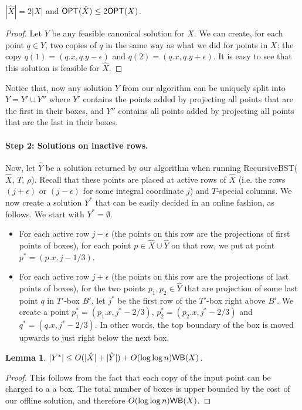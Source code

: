 \documentclass[11pt]{article}
\numberwithin{equation}{section}
\newtheorem{lemma}[theorem]{Lemma}
\theoremstyle{definition}
\theoremstyle{plain}
\begin{document}
\begin{observation}
$|\hat{X}| = 2|X|$ and $\mbox{\sf OPT}(\hat{X}) \leq 2 \mbox{\sf OPT}(X)$. 
\end{observation} 
\begin{proof}
Let $Y$ be any feasible canonical solution for $X$. 
We can create, for each point $q \in Y$, two copies of $q$ in the same way as what we did for points in $X$: the copy $q(1) = (q.x, q.y- \epsilon)$ and $q(2) = (q.x, q.y+\epsilon)$. 
It is easy to see that this solution is feasible for $\hat{X}$.  
\end{proof} 
 
%
Notice that, now any solution $Y$ from our algorithm can be uniquely split into $Y = Y' \cup Y''$ where $Y'$ contains the points added by projecting all points that are the first in their boxes, and $Y''$ contains all points added by projecting all points that are the last in their boxes.
 

\paragraph*{Step 2: Solutions on inactive rows.} 
Now, let $\hat{Y}$ be a solution returned by our algorithm when running {\sc RecursiveBST}($\hat{X}$, $T$, $\rho$). 
Recall that these points are placed at active rows of $\hat{X}$ (i.e. the rows $(j+\epsilon)$ or $(j-\epsilon)$ for some integral coordinate $j$) and $T$-special columns. 
We now create a solution $Y^*$ that can be easily decided in an online fashion, as follows. We start with $Y^* = \emptyset$. 

\begin{itemize}
\item For each active row $j - \epsilon$ (the points on this row are the projections of first points of boxes), for each point $p \in \hat{X} \cup \hat{Y}$ on that row, we put at point $p^* = (p.x, j-1/3)$.  


\item For each active row $j+\epsilon$ (the points on this row are the projections of last points of boxes), for the two points $p_1, p_2 \in \hat{Y}$ that are projection of some last point $q$ in $T'$-box $B'$, let $j^*$ be the first row of the $T'$-box right above $B'$. We create a point $p^*_1 = (p_1.x, j^* - 2/3)$, $p^*_2 = (p_2.x, j^* - 2/3)$ and $q^* = (q.x, j^* - 2/3)$.
In other words, the top boundary of the box is moved upwards to just right below the next box.  
%
\end{itemize}  
%
%
  

\begin{lemma} 
$|Y^*| \leq O(|\hat{X}| + |\hat{Y}|) + O(\log \log n) \mathsf{WB}(X)$.   
\end{lemma} 
\begin{proof}
This follows from the fact that each copy of the input point can be charged to a a box. 
The total number of boxes is upper bounded by the cost of our offline solution, and therefore $O(\log \log n) \mathsf{WB}(X)$. 
\end{proof} 
\end{document}

